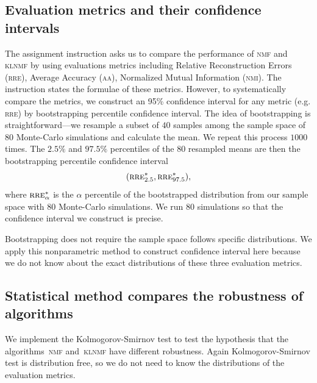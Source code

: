 \subsection{Evaluation metrics and their confidence intervals \label{ci}}
The assignment instruction asks us to compare the performance of \textsc{nmf} and \textsc{klnmf} by using evaluations metrics including Relative Reconstruction Errors (\textsc{rre}), Average Accuracy (\textsc{aa}), Normalized Mutual Information (\textsc{nmi}). The instruction states the formulae of these metrics. However, to systematically compare the metrics, we construct an 95\% confidence interval for any metric (e.g. \textsc{rre}) by bootstrapping percentile confidence interval. The idea of bootstrapping  is straightforward---we resample a subset of $40$ samples among the sample space of $80$ Monte-Carlo simulations and calculate the mean. We repeat this process $1000$ times. The $2.5\%$ and $97.5\%$ percentiles of the $80$ resampled means are then the bootstrapping percentile confidence interval
\begin{equation}
(\textsc{rre}^*_{2.5}, \textsc{rre}^*_{97.5}), \label{eq:boot}
\end{equation}
where $\textsc{rre}^*_{\alpha}$ is the $\alpha$ percentile of the bootstrapped distribution from our sample space with $80$ Monte-Carlo simulations.  We run $80$ simulations so that the confidence interval we construct is precise.

Bootstrapping does not require the sample space follows specific distributions. We apply this nonparametric method to construct confidence interval here because we do not know about the exact distributions of these three evaluation metrics.

\subsection{Statistical method compares the robustness of algorithms}
We implement the Kolmogorov-Smirnov test to test the hypothesis that the algorithms~\textsc{nmf} and~\textsc{klnmf} have different robustness. Again Kolmogorov-Smirnov test is distribution free, so we do not need to know the distributions of the evaluation metrics.

